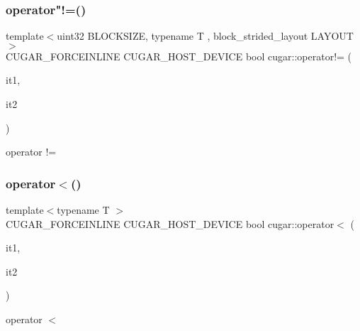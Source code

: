 \subsubsection{\texorpdfstring{operator"!=()}{operator!=()}\hspace{0.1cm}{\footnotesize\ttfamily [2/2]}}
{\footnotesize\ttfamily template$<$uint32 B\+L\+O\+C\+K\+S\+I\+ZE, typename T , block\+\_\+strided\+\_\+layout L\+A\+Y\+O\+UT$>$ \\
C\+U\+G\+A\+R\+\_\+\+F\+O\+R\+C\+E\+I\+N\+L\+I\+NE C\+U\+G\+A\+R\+\_\+\+H\+O\+S\+T\+\_\+\+D\+E\+V\+I\+CE bool cugar\+::operator!= (\begin{DoxyParamCaption}\item[{const \hyperlink{structcugar_1_1block__strided__iterator}{block\+\_\+strided\+\_\+iterator}$<$ B\+L\+O\+C\+K\+S\+I\+ZE, T, L\+A\+Y\+O\+UT $>$}]{it1,  }\item[{const \hyperlink{structcugar_1_1block__strided__iterator}{block\+\_\+strided\+\_\+iterator}$<$ B\+L\+O\+C\+K\+S\+I\+ZE, T, L\+A\+Y\+O\+UT $>$}]{it2 }\end{DoxyParamCaption})}

operator != \mbox{\label{group___iterators_ga7e34173347793a8a35add6b79d2b1c2b}} 
\subsubsection{\texorpdfstring{operator$<$()}{operator<()}}
{\footnotesize\ttfamily template$<$typename T $>$ \\
C\+U\+G\+A\+R\+\_\+\+F\+O\+R\+C\+E\+I\+N\+L\+I\+NE C\+U\+G\+A\+R\+\_\+\+H\+O\+S\+T\+\_\+\+D\+E\+V\+I\+CE bool cugar\+::operator$<$ (\begin{DoxyParamCaption}\item[{const \hyperlink{structcugar_1_1strided__iterator}{strided\+\_\+iterator}$<$ T $>$}]{it1,  }\item[{const \hyperlink{structcugar_1_1strided__iterator}{strided\+\_\+iterator}$<$ T $>$}]{it2 }\end{DoxyParamCaption})}

operator $<$ \mbox{\label{group___iterators_ga863ca4b5ec73bff722711892c9468f44}} 
